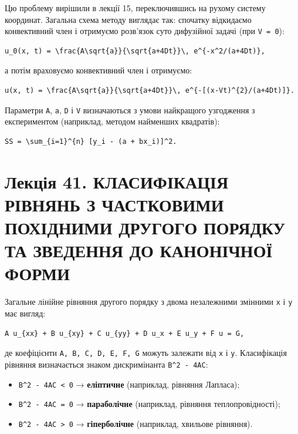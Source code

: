 \documentclass[
  ukrainian,
]{article}
\providecommand{\tightlist}{%
  \setlength{\itemsep}{0pt}\setlength{\parskip}{0pt}}
\begin{document}
Цю проблему вирішили в лекції 15, переключившись на рухому систему
координат. Загальна схема методу виглядає так: спочатку відкидаємо
конвективний член і отримуємо розв'язок суто дифузійної задачі (при
\texttt{V\ =\ 0}):

\begin{verbatim}
u_0(x, t) = \frac{A\sqrt{a}}{\sqrt{a+4Dt}}\, e^{-x^2/(a+4Dt)},
\end{verbatim}

а потім враховуємо конвективний член і отримуємо:

\begin{verbatim}
u(x, t) = \frac{A\sqrt{a}}{\sqrt{a+4Dt}}\, e^{-[(x-Vt)^{2}/(a+4Dt)]}.
\end{verbatim}

Параметри \texttt{A}, \texttt{a}, \texttt{D} і \texttt{V} визначаються з
умови найкращого узгодження з експериментом (наприклад, методом
найменших квадратів):

\begin{verbatim}
SS = \sum_{i=1}^{n} [y_i - (a + bx_i)]^2.
\end{verbatim}

\section{Лекція 41. КЛАСИФІКАЦІЯ РІВНЯНЬ З ЧАСТКОВИМИ ПОХІДНИМИ ДРУГОГО
ПОРЯДКУ ТА ЗВЕДЕННЯ ДО КАНОНІЧНОЇ
ФОРМИ}\label{ux43bux435ux43aux446ux456ux44f-41.-ux43aux43bux430ux441ux438ux444ux456ux43aux430ux446ux456ux44f-ux440ux456ux432ux43dux44fux43dux44c-ux437-ux447ux430ux441ux442ux43aux43eux432ux438ux43cux438-ux43fux43eux445ux456ux434ux43dux438ux43cux438-ux434ux440ux443ux433ux43eux433ux43e-ux43fux43eux440ux44fux434ux43aux443-ux442ux430-ux437ux432ux435ux434ux435ux43dux43dux44f-ux434ux43e-ux43aux430ux43dux43eux43dux456ux447ux43dux43eux457-ux444ux43eux440ux43cux438}

Загальне лінійне рівняння другого порядку з двома незалежними змінними
\texttt{x} і \texttt{y} має вигляд:

\begin{verbatim}
A u_{xx} + B u_{xy} + C u_{yy} + D u_x + E u_y + F u = G,
\end{verbatim}

де коефіцієнти \texttt{A,\ B,\ C,\ D,\ E,\ F,\ G} можуть залежати від
\texttt{x} і \texttt{y}. Класифікація рівняння визначається знаком
дискримінанта \texttt{B\^{}2\ -\ 4AC}:

\begin{itemize}
\tightlist
\item
  \texttt{B\^{}2\ -\ 4AC\ \textless{}\ 0} → \textbf{еліптичне}
  (наприклад, рівняння Лапласа);
\item
  \texttt{B\^{}2\ -\ 4AC\ =\ 0} → \textbf{параболічне} (наприклад,
  рівняння теплопровідності);
\item
  \texttt{B\^{}2\ -\ 4AC\ \textgreater{}\ 0} → \textbf{гіперболічне}
  (наприклад, хвильове рівняння).
\end{itemize}
\end{document}
